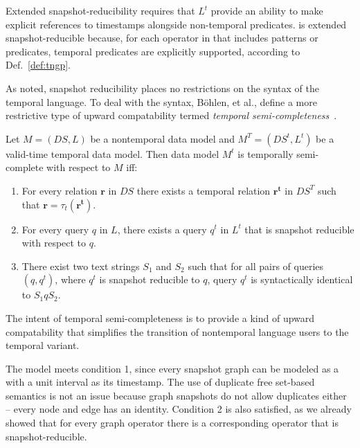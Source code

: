 Extended snapshot-reducibility requires that $L^t$ provide an ability
to make explicit references to timestamps alongside non-temporal
predicates.  \tga is extended snapshot-reducible because, for each
operator in \tga that includes patterns or predicates, temporal
predicates are explicitly supported, according to Def.~\ref{def:tngp}.

As noted, snapshot reducibility places no restrictions on the syntax
of the temporal language.  To deal with the syntax, B{\"{o}}hlen, et
al., define a more restrictive type of upward compatability termed {\em
  temporal semi-completeness}~\cite{Bohlen1995}.

\begin{definition} Let $M = (DS,L)$ be a nontemporal data
model and $M^T = (DS^t,L^t)$ be a valid-time temporal data model.
Then data model $M^t$ is temporally semi-complete with respect to $M$
iff:

\begin{enumerate}[noitemsep,itemindent=\dimexpr\labelwidth+\labelsep\relax,leftmargin=7pt]
\item For every relation $\mathbf{r}$ in $DS$ there exists a temporal
  relation $\mathbf{r^t}$ in $DS^T$ such that $\mathbf{r} =
  \tau_t(\mathbf{r^t})$.
\item For every query $q$ in $L$, there exists a query $q^t$ in $L^t$
  that is snapshot reducible with respect to $q$.
\item There exist two text strings $S_1$ and $S_2$ such that for all
  pairs of queries $(q,q^t)$, where $q^t$ is snapshot reducible to
  $q$, query $q^t$ is syntactically identical to $S_1qS_2$.
\end{enumerate}
\end{definition}

The intent of temporal semi-completeness is to provide a kind of
upward compatability that simplifies the transition of nontemporal
language users to the temporal variant.  

The \tg model meets condition 1, since every snapshot graph
  can be modeled as a \tg with a unit interval as its timestamp.  The
  use of duplicate free set-based semantics is not an issue because
  graph snapshots do not allow duplicates either -- every node and
  edge has an identity.  Condition 2 is also satisfied, as we already
  showed that for every graph operator there is a corresponding \tga
  operator that is snapshot-reducible.

